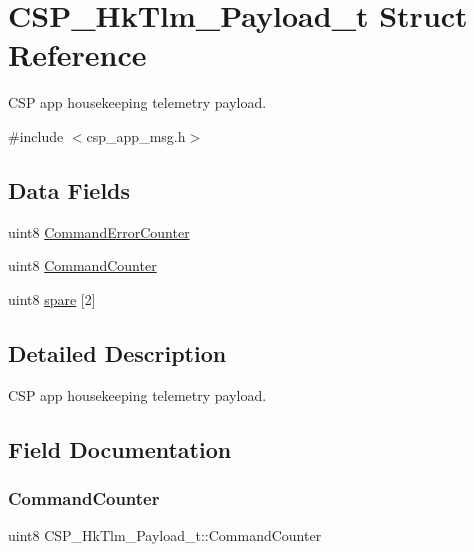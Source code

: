 \hypertarget{structCSP__HkTlm__Payload__t}{}\section{C\+S\+P\+\_\+\+Hk\+Tlm\+\_\+\+Payload\+\_\+t Struct Reference}
\label{structCSP__HkTlm__Payload__t}


C\+SP app housekeeping telemetry payload.  




{\ttfamily \#include $<$csp\+\_\+app\+\_\+msg.\+h$>$}

\subsection*{Data Fields}
\begin{DoxyCompactItemize}
\item 
uint8 \hyperlink{structCSP__HkTlm__Payload__t_a6b79d521c2dcef2c8850fb6b412a24f7}{Command\+Error\+Counter}
\item 
uint8 \hyperlink{structCSP__HkTlm__Payload__t_acbb0e527323e7b67d92218065855c3cf}{Command\+Counter}
\item 
uint8 \hyperlink{structCSP__HkTlm__Payload__t_a7499d4238a0d765dd433a765b0c5a96e}{spare} \mbox{[}2\mbox{]}
\end{DoxyCompactItemize}


\subsection{Detailed Description}
C\+SP app housekeeping telemetry payload. 

\subsection{Field Documentation}
\mbox{\label{structCSP__HkTlm__Payload__t_acbb0e527323e7b67d92218065855c3cf}} 
\subsubsection{\texorpdfstring{Command\+Counter}{CommandCounter}}
{\footnotesize\ttfamily uint8 C\+S\+P\+\_\+\+Hk\+Tlm\+\_\+\+Payload\+\_\+t\+::\+Command\+Counter}


